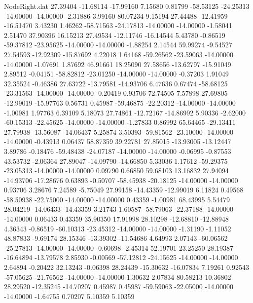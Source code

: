 \begin{filecontents}{NodeRight.dat}
  27.39404  -11.68114  -17.99160     7.15680    0.81799  -58.53125  -24.25313  -14.00000  -14.00000   -2.31886    3.99160   80.07234    9.15194
  27.44488  -12.41959  -16.51470     3.43230    1.46262  -58.71563  -24.17813  -14.00000  -14.00000   -1.58041    2.51470   37.90396   16.15213
  27.49534  -12.11746  -16.14544     5.43780   -0.86519  -59.37812  -23.95625  -14.00000  -14.00000   -1.88254    2.14544   59.99274   -9.54527
  27.54593  -12.92309  -15.87692     4.22018    1.64168  -59.26562  -23.59063  -14.00000  -14.00000   -1.07691    1.87692   46.91661   18.25090
  27.58656  -13.62797  -15.91049     2.89512   -0.04151  -58.82812  -23.01250  -14.00000  -14.00000   -0.37203    1.91049   32.35524   -0.46386
  27.63722  -13.79581  -14.93706     6.47636    0.67474  -58.68125  -23.31563  -14.00000  -14.00000   -0.20419    0.93706   72.74505    7.57898
  27.69805  -12.99019  -15.97763     0.56731    0.45987  -59.46875  -22.20312  -14.00000  -14.00000   -1.00981    1.97763    6.39109    5.18073
  27.74861  -12.72167  -14.86992     5.90336   -2.62000  -60.15313  -22.45625  -14.00000  -14.00000   -1.27833    0.86992   65.64465  -29.13411
  27.79938  -13.56087  -14.06437     5.25874    3.50393  -59.81562  -23.10000  -14.00000  -14.00000   -0.43913    0.06437   58.87359   39.22781
  27.85015  -13.93005  -13.12447     3.89786   -0.18476  -59.48438  -24.07187  -14.00000  -14.00000   -0.06995   -0.87553   43.53732   -2.06364
  27.89047  -14.09790  -14.66850     5.33036    1.17612  -59.29375  -23.05313  -14.00000  -14.00000    0.09790    0.66850   59.68103   13.16832
  27.94094  -14.93706  -17.28676     0.63893   -0.50707  -58.45938  -20.18125  -14.00000  -14.00000    0.93706    3.28676    7.24589   -5.75049
  27.99158  -14.43359  -12.99019     6.11824    0.49568  -58.50938  -22.75000  -14.00000  -14.00000    0.43359   -1.00981   68.43995    5.54479
  28.04219  -14.06433  -14.43359     3.21743    1.60587  -58.79063  -22.37188  -14.00000  -14.00000    0.06433    0.43359   35.90350   17.91998
  28.10298  -12.68810  -12.88948     4.36343   -0.86519  -60.10313  -23.45312  -14.00000  -14.00000   -1.31190   -1.11052   48.87833   -9.69174
  28.15346  -13.39302  -11.54686     4.64993    2.07143  -60.06562  -25.27813  -14.00000  -14.00000   -0.60698   -2.45314   52.19701   23.25250
  28.19387  -16.64894  -13.79578     2.85930   -0.00569  -57.12812  -24.15625  -14.00000  -14.00000    2.64894   -0.20422   32.13243   -0.06398
  28.24439  -15.30632  -16.07834     7.19261    0.92543  -57.05625  -21.76562  -14.00000  -14.00000    1.30632    2.07834   80.58213   10.36802
  28.29520  -12.35245  -14.70207     0.45987    0.45987  -59.59063  -22.05000  -14.00000  -14.00000   -1.64755    0.70207    5.10359    5.10359

\end{filecontents}
